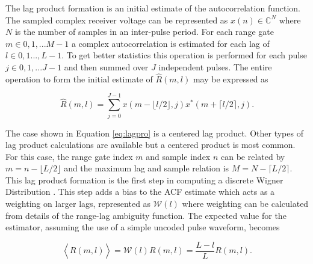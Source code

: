 The lag product formation is an initial estimate of the autocorrelation function. The sampled complex receiver voltage can be represented as $x(n) \in\mathbb{C}^N$ where $N$ is the number of samples in an inter-pulse period. For each range gate $m\in 0,1,...M-1$ a complex autocorrelation is estimated for each lag of $l \in 0,1...,L-1$.  To get better statistics this operation is performed for each pulse $j\in 0,1,...J-1$ and then summed over $J$ independent pulses. The entire operation to form the initial estimate of $\widehat{R}(m,l)$ may be expressed as

\begin{equation}
\label{eq:lagpro}
\widehat{R}(m,l) = \displaystyle\sum\limits_{j=0}^{J-1} x(m-\lfloor l/2\rfloor,j)x^*(m+\lceil l/2 \rceil,j).
\end{equation}

The case shown in Equation \ref{eq:lagpro} is a centered lag product.  Other types of lag product calculations are available but a centered product is most common. For this case, the range gate index $m$ and sample index $n$ can be related by $m=n-\lfloor L/2\rfloor$ and the maximum lag and sample relation is $M=N-\lceil L/2 \rceil$.  This lag product formation is the first step in computing a discrete Wigner Distribution \cite{TFAcohen}. This  step adds a bias to the ACF estimate which acts as a weighting on larger lags, represented as $\mathcal{W}(l)$ where weighting can be calculated from details of the range-lag ambiguity function. The expected value for the estimator, assuming the use of a simple uncoded pulse waveform, becomes

\begin{equation}
\label{eq:lagprobias}
\left\langle\widehat{R}(m,l) \right\rangle = \mathcal{W}(l)R(m,l) =\frac{L-l}{L}R(m,l).
\end{equation}

%
%

